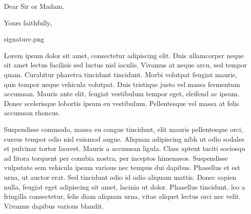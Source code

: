 \documentclass[11pt,a4paper,sans]{moderncv}        %
\begin{document}

\clearpage
\date{January 01, 1984}
\subject{Job application}
\opening{Dear Sir or Madam,}
\closing{Yours faithfully,}
\signature{0.9}{signature.png}                     %
\makelettertitle

Lorem ipsum dolor sit amet, consectetur adipiscing elit. Duis ullamcorper neque sit amet lectus facilisis sed luctus nisl iaculis. Vivamus at neque arcu, sed tempor quam. Curabitur pharetra tincidunt tincidunt. Morbi volutpat feugiat mauris, quis tempor neque vehicula volutpat. Duis tristique justo vel massa fermentum accumsan. Mauris ante elit, feugiat vestibulum tempor eget, eleifend ac ipsum. Donec scelerisque lobortis ipsum eu vestibulum. Pellentesque vel massa at felis accumsan rhoncus.

Suspendisse commodo, massa eu congue tincidunt, elit mauris pellentesque orci, cursus tempor odio nisl euismod augue. Aliquam adipiscing nibh ut odio sodales et pulvinar tortor laoreet. Mauris a accumsan ligula. Class aptent taciti sociosqu ad litora torquent per conubia nostra, per inceptos himenaeos. Suspendisse vulputate sem vehicula ipsum various nec tempus dui dapibus. Phasellus et est urna, ut auctor erat. Sed tincidunt odio id odio aliquam mattis. Donec sapien nulla, feugiat eget adipiscing sit amet, lacinia ut dolor. Phasellus tincidunt, leo a fringilla consectetur, felis diam aliquam urna, vitae aliquet lectus orci nec velit. Vivamus dapibus various blandit.
\end{document}
